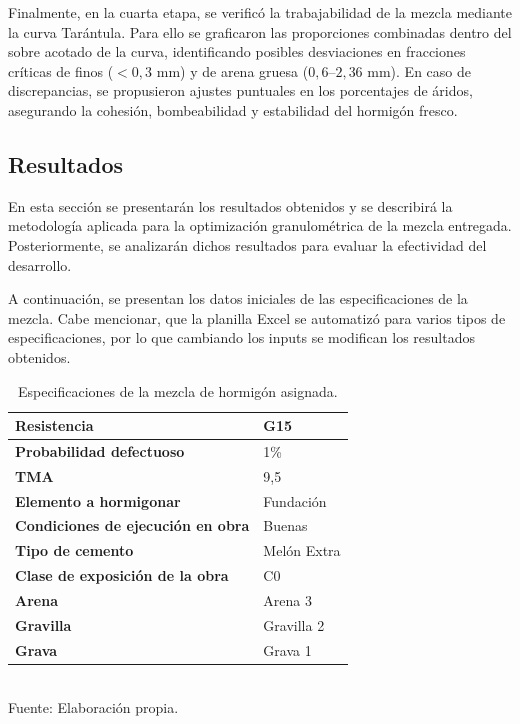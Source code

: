 Finalmente, en la cuarta etapa, se verificó la trabajabilidad de la mezcla mediante la curva Tarántula. Para ello se graficaron las proporciones combinadas dentro del sobre acotado de la curva, identificando posibles desviaciones en fracciones críticas de finos ($< 0,3$ mm) y de arena gruesa ($0,6$–$2,36$ mm). En caso de discrepancias, se propusieron ajustes puntuales en los porcentajes de áridos, asegurando la cohesión, bombeabilidad y estabilidad del hormigón fresco.

\subsection{Resultados}

En esta sección se presentarán los resultados obtenidos y se describirá la metodología aplicada para la optimización granulométrica de la mezcla entregada. Posteriormente, se analizarán dichos resultados para evaluar la efectividad del desarrollo.

A continuación, se presentan los datos iniciales de las especificaciones de la mezcla. Cabe mencionar, que la planilla Excel se automatizó para varios tipos de especificaciones, por lo que cambiando los inputs se modifican los resultados obtenidos.

\begin{table}[H]
\centering
\caption{Especificaciones de la mezcla de hormigón asignada.}
\begin{tabular}{|l|l|}
\hline
\textbf{Resistencia} & G15 \\ \hline
\textbf{Probabilidad defectuoso} & 1\% \\ \hline
\textbf{TMA} & 9,5 \\ \hline
\textbf{Elemento a hormigonar} & Fundación \\ \hline
\textbf{Condiciones de ejecución en obra} & Buenas \\ \hline
\textbf{Tipo de cemento} & Melón Extra \\ \hline
\textbf{Clase de exposición de la obra} & C0 \\ \hline
\textbf{Arena} & Arena 3 \\ \hline
\textbf{Gravilla} & Gravilla 2 \\ \hline
\textbf{Grava} & Grava 1 \\ \hline
\end{tabular}
\\Fuente: Elaboración propia.
\end{table}


